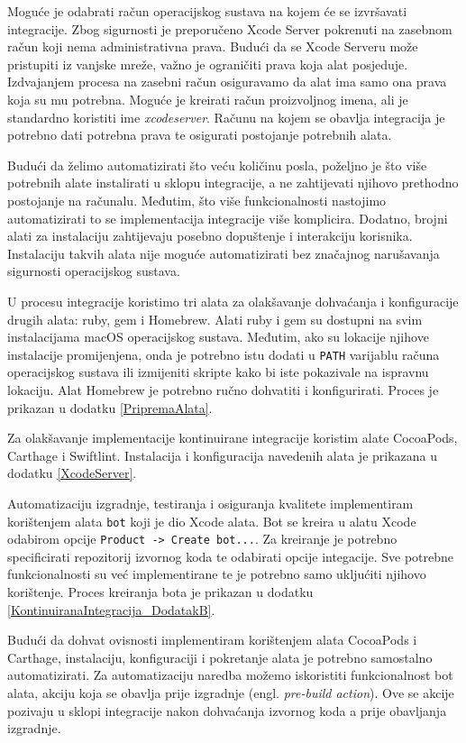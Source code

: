 \documentclass[times, utf8, diplomski, numeric]{fer}
\newcommand{\eng}[1]{(engl. \textit{#1})}
\begin{document}
Moguće je odabrati račun operacijskog sustava na kojem će se izvršavati integracije. Zbog sigurnosti je preporučeno Xcode Server pokrenuti na zasebnom račun koji nema administrativna prava. Budući da se Xcode Serveru može pristupiti iz vanjske mreže, važno je ograničiti prava koja alat posjeduje. Izdvajanjem procesa na zasebni račun osiguravamo da alat ima samo ona prava koja su mu potrebna. Moguće je kreirati račun proizvoljnog imena, ali je standardno koristiti ime \textit{xcodeserver}. Računu na kojem se obavlja integracija je potrebno dati potrebna prava te osigurati postojanje potrebnih alata.

Budući da želimo automatizirati što veću količinu posla, poželjno je što više potrebnih alate instalirati u sklopu integracije, a ne zahtijevati njihovo prethodno postojanje na računalu. Međutim, što više funkcionalnosti nastojimo automatizirati to se implementacija integracije više komplicira. Dodatno, brojni alati za instalaciju zahtijevaju posebno dopuštenje i interakciju korisnika. Instalaciju takvih alata nije moguće automatizirati bez značajnog narušavanja sigurnosti operacijskog sustava.

U procesu integracije koristimo tri alata za olakšavanje dohvaćanja i konfiguracije drugih alata: ruby, gem i Homebrew. Alati ruby i gem su dostupni na svim instalacijama macOS operacijskog sustava. Međutim, ako su lokacije njihove instalacije promijenjena, onda je potrebno istu dodati u \verb|PATH| varijablu računa operacijskog sustava ili izmijeniti skripte kako bi iste pokazivale na ispravnu lokaciju. Alat Homebrew je potrebno ručno dohvatiti i konfigurirati. Proces je prikazan u dodatku \ref{PripremaAlata}.

Za olakšavanje implementacije kontinuirane integracije koristim alate CocoaPods, Carthage i Swiftlint. Instalacija i konfiguracija navedenih alata je prikazana u dodatku \ref{XcodeServer}.

Automatizaciju izgradnje, testiranja i osiguranja kvalitete implementiram korištenjem alata \verb|bot| koji je dio Xcode alata. Bot se kreira u alatu Xcode odabirom opcije \verb|Product -> Create bot...|. Za kreiranje je potrebno specificirati repozitorij izvornog koda te odabirati opcije integacije. Sve potrebne funkcionalnosti su već implementirane te je potrebno samo ukljućiti njihovo korištenje. Proces kreiranja bota je prikazan u dodatku \ref{KontinuiranaIntegracija_DodatakB}.

Budući da dohvat ovisnosti implementiram korištenjem alata CocoaPods i Carthage, instalaciju, konfiguraciji i pokretanje alata je potrebno samostalno automatizirati. Za automatizaciju naredba možemo iskoristiti funkcionalnost bot alata, akciju koja se obavlja prije izgradnje \eng{pre-build action}. Ove se akcije pozivaju u sklopi integracije nakon dohvaćanja izvornog koda a prije obavljanja izgradnje.
\end{document}
